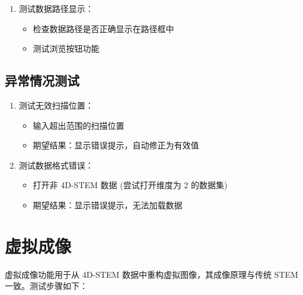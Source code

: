 \documentclass[a4paper,12pt]{report}	%
\begin{document}
\begin{enumerate}
\begin{itemize}
        \begin{itemize}
            \item 测试流程：切换不同颜色映射
            \item 期望结果：图像颜色正确变化，支持所有预设颜色映射
        \end{itemize}
    \end{itemize}
    \item 测试数据路径显示：
    \begin{itemize}
        \item 检查数据路径是否正确显示在路径框中
        \item 测试浏览按钮功能
    \end{itemize}
\end{enumerate}

\subsection{异常情况测试}
\begin{enumerate}
    \item 测试无效扫描位置：
    \begin{itemize}
        \item 输入超出范围的扫描位置
        \item 期望结果：显示错误提示，自动修正为有效值
    \end{itemize}

    \item 测试数据格式错误：
    \begin{itemize}
        \item 打开非 4D-STEM 数据 (尝试打开维度为 2 的数据集)
        \item 期望结果：显示错误提示，无法加载数据
    \end{itemize}
\end{enumerate}

\section{虚拟成像}

虚拟成像功能用于从 4D-STEM 数据中重构虚拟图像，其成像原理与传统 STEM 一致。测试步骤如下：
\end{document}
